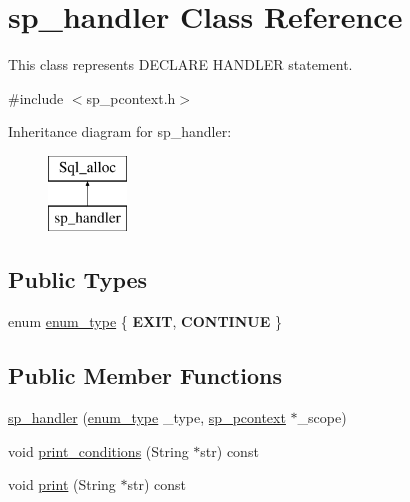\hypertarget{classsp__handler}{}\section{sp\+\_\+handler Class Reference}
\label{classsp__handler}


This class represents \textquotesingle{}D\+E\+C\+L\+A\+RE H\+A\+N\+D\+L\+ER\textquotesingle{} statement.  




{\ttfamily \#include $<$sp\+\_\+pcontext.\+h$>$}

Inheritance diagram for sp\+\_\+handler\+:\begin{figure}[H]
\begin{center}
\leavevmode
\includegraphics[height=2.000000cm]{classsp__handler}
\end{center}
\end{figure}
\subsection*{Public Types}
\begin{DoxyCompactItemize}
\item 
enum \mbox{\hyperlink{classsp__handler_a702400dd1cd8b2933a38a9e4a5f1eb09}{enum\+\_\+type}} \{ {\bfseries E\+X\+IT}, 
{\bfseries C\+O\+N\+T\+I\+N\+UE}
 \}
\end{DoxyCompactItemize}
\subsection*{Public Member Functions}
\begin{DoxyCompactItemize}
\item 
\mbox{\hyperlink{classsp__handler_a3068e48dec054d1d88566157bd15db28}{sp\+\_\+handler}} (\mbox{\hyperlink{classsp__handler_a702400dd1cd8b2933a38a9e4a5f1eb09}{enum\+\_\+type}} \+\_\+type, \mbox{\hyperlink{classsp__pcontext}{sp\+\_\+pcontext}} $\ast$\+\_\+scope)
\item 
void \mbox{\hyperlink{classsp__handler_a63f42365a8485bdc497f09beab7c3b82}{print\+\_\+conditions}} (String $\ast$str) const
\item 
void \mbox{\hyperlink{classsp__handler_a8663fc5f5e6c6e8958b5d8de6ced874b}{print}} (String $\ast$str) const
\end{DoxyCompactItemize}
